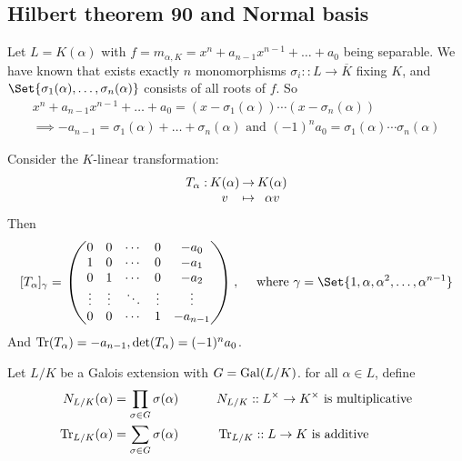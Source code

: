 \subsection{Hilbert theorem 90 and Normal basis}

Let $L = K(\alpha)$ with $f = m_{\alpha, K} = x^n + a_{n-1} x^{n-1} + \dots + a_0$ being separable.
We have known that exists exactly $n$ monomorphisms $\sigma_i :: L \to \overline{K}$ fixing $K$,
and $\Set{\sigma_1(\alpha), \dots, \sigma_n(\alpha)}$ consists of all roots of $f$.
So
\begin{multline*}
  x^n + a_{n-1} x^{n-1} + \dots + a_0 = (x - \sigma_1(\alpha)) \dotsm (x - \sigma_n(\alpha)) \\
  \implies -a_{n-1} = \sigma_1(\alpha) + \dots + \sigma_n(\alpha) \text{ and }
  (-1)^n a_0 = \sigma_1(\alpha) \dotsm \sigma_n(\alpha)
\end{multline*}

Consider the $K$-linear transformation:
\[ \deffunc{T_\alpha}{K(\alpha)}{K(\alpha)}{v}{\alpha v} \]
Then
\[ [T_\alpha]_\gamma = \begin{pmatrix}
    0 & 0 & \cdots & 0 & -a_0 \\
    1 & 0 & \cdots & 0 & -a_1 \\
    0 & 1 & \cdots & 0 & -a_2 \\
    \vdots & \vdots & \ddots & \vdots & \vdots \\
    0 & 0 & \cdots & 1 & -a_{n-1}
  \end{pmatrix}, \quad \text{ where } \gamma = \Set{1, \alpha, \alpha^2, \dots, \alpha^{n-1}} \]
And $\operatorname{Tr}(T_\alpha) = -a_{n-1}, \det(T_\alpha) = (-1)^n a_0$.

\begin{definition}
  Let $L/K$ be a Galois extension with $G = \operatorname{Gal}(L/K)$.
  for all $\alpha \in L$, define
  \begin{alignat*}{4}
    N_{L/K}(\alpha) &= \prod_{\sigma \in G} \sigma(\alpha) \quad\quad && N_{L/K} :: L^\times \to K^\times
    \text{ is multiplicative} \\
    \operatorname{Tr}_{L/K}(\alpha) &= \sum_{\sigma \in G} \sigma(\alpha) \quad\quad && \operatorname{Tr}_{L/K} :: L \to K
    \text{ is additive}
  \end{alignat*}
\end{definition}

